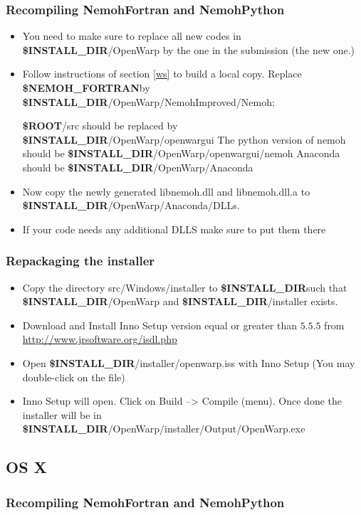\documentclass[12pt]{article}
\newcommand{\ROOT}{{\textbf{\$ROOT}}}
\newcommand{\NEMOHFORTRAN}{{\textbf{\$NEMOH{\_}FORTRAN}}}
\newcommand{\INSTALLDIR}{{\textbf{\$INSTALL{\_}DIR}}}
\begin{document}
\subsubsection{Recompiling NemohFortran and NemohPython}
\begin{itemize}
	\item You need to make sure to replace all new codes in \INSTALLDIR/OpenWarp by the one in the submission (the new one.)
 \item Follow instructions of section \ref{ws} to build a local copy.
  Replace \NEMOHFORTRAN by \INSTALLDIR/OpenWarp/NemohImproved/Nemoh;
  
\ROOT/src should be replaced by \INSTALLDIR/OpenWarp/openwargui
The python version of nemoh should be \INSTALLDIR/OpenWarp/openwargui/nemoh Anaconda should be \INSTALLDIR/OpenWarp/Anaconda
\item  Now copy the newly generated libnemoh.dll and libnemoh.dll.a to \INSTALLDIR/OpenWarp/Anaconda/DLLs. 

\item If your code needs any additional DLLS make sure to put them there
\end{itemize}

\subsubsection{Repackaging the installer}
\begin{itemize}
	\item Copy the directory src/Windows/installer to \INSTALLDIR such that \INSTALLDIR/OpenWarp and \INSTALLDIR/installer exists.
\item Download and Install Inno Setup version equal or greater than $5.5.5$ from \url{http://www.jrsoftware.org/isdl.php}
\item Open \INSTALLDIR/installer/openwarp.iss with Inno Setup (You may double-click on the file)
\item Inno Setup will open. Click on Build --> Compile (menu). Once done the installer will be in
\INSTALLDIR/OpenWarp/installer/Output/OpenWarp.exe
\end{itemize}

\subsection{OS X}

\subsubsection{Recompiling NemohFortran and NemohPython}
\end{document}
